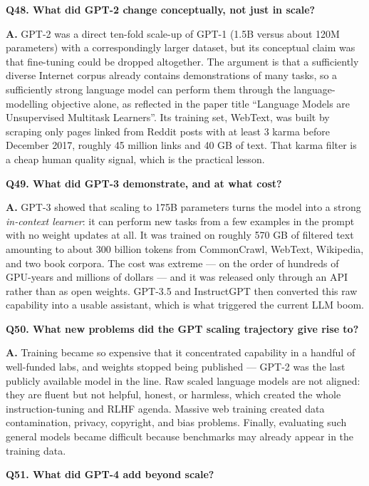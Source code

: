 \documentclass[11pt]{article}
\begin{document}
\medskip
\noindent\textbf{Q48. What did GPT-2 change conceptually, not just in scale?}

\noindent\textbf{A.} GPT-2 was a direct ten-fold scale-up of GPT-1 (1.5B versus about 120M parameters) with a correspondingly larger dataset, but its conceptual claim was that fine-tuning could be dropped altogether. The argument is that a sufficiently diverse Internet corpus already contains demonstrations of many tasks, so a sufficiently strong language model can perform them through the language-modelling objective alone, as reflected in the paper title ``Language Models are Unsupervised Multitask Learners''. Its training set, WebText, was built by scraping only pages linked from Reddit posts with at least 3 karma before December 2017, roughly 45 million links and 40 GB of text. That karma filter is a cheap human quality signal, which is the practical lesson.

\medskip
\noindent\textbf{Q49. What did GPT-3 demonstrate, and at what cost?}

\noindent\textbf{A.} GPT-3 showed that scaling to 175B parameters turns the model into a strong \emph{in-context learner}: it can perform new tasks from a few examples in the prompt with no weight updates at all. It was trained on roughly 570 GB of filtered text amounting to about 300 billion tokens from CommonCrawl, WebText, Wikipedia, and two book corpora. The cost was extreme --- on the order of hundreds of GPU-years and millions of dollars --- and it was released only through an API rather than as open weights. GPT-3.5 and InstructGPT then converted this raw capability into a usable assistant, which is what triggered the current LLM boom.

\medskip
\noindent\textbf{Q50. What new problems did the GPT scaling trajectory give rise to?}

\noindent\textbf{A.} Training became so expensive that it concentrated capability in a handful of well-funded labs, and weights stopped being published --- GPT-2 was the last publicly available model in the line. Raw scaled language models are not aligned: they are fluent but not helpful, honest, or harmless, which created the whole instruction-tuning and RLHF agenda. Massive web training created data contamination, privacy, copyright, and bias problems. Finally, evaluating such general models became difficult because benchmarks may already appear in the training data.

\medskip
\noindent\textbf{Q51. What did GPT-4 add beyond scale?}
\end{document}

